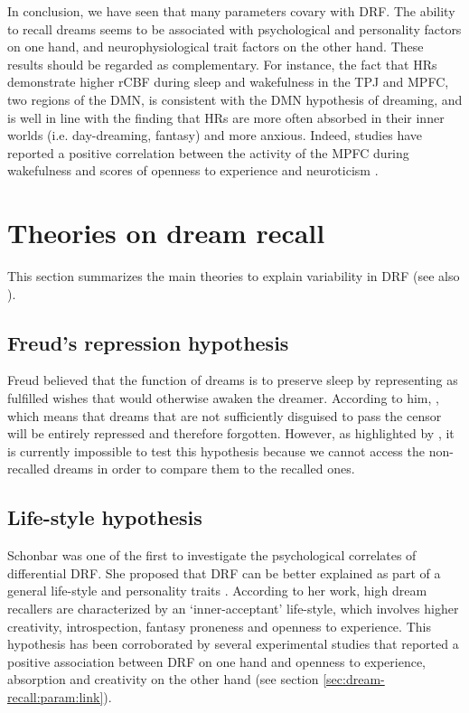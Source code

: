 In conclusion, we have seen that many parameters covary with DRF. The ability to recall dreams seems to be associated with psychological and personality factors on one hand, and neurophysiological trait factors on the other hand. These results should be regarded as complementary. For instance, the fact that HRs demonstrate higher rCBF during sleep and wakefulness in the TPJ and MPFC, two regions of the DMN, is consistent with the DMN hypothesis of dreaming, and is well in line with the finding that HRs are more often absorbed in their inner worlds (i.e. day-dreaming, fantasy) and more anxious. Indeed, studies have reported a positive correlation between the activity of the MPFC during wakefulness and scores of openness to experience \citep{sutin_sex_2009} and neuroticism \citep{zald_brain_2002}.

\section{Theories on dream recall}
\label{sec:dream-recall:theories}

This section summarizes the main theories to explain variability in DRF (see also \citealp{schredl_dream_1996}).

\subsection{Freud’s repression hypothesis}
\label{sec:dream-recall:theories:freud}

Freud believed that the function of dreams is to preserve sleep by representing as fulfilled wishes that would otherwise awaken the dreamer. According to him,  \citep{freud_interpretation_1900}, which means that dreams that are not sufficiently disguised to pass the censor will be entirely repressed and therefore forgotten. However, as highlighted by \citet{schredl_dream_1999}, it is currently impossible to test this hypothesis because we cannot access the non-recalled dreams in order to compare them to the recalled ones.

\subsection{Life-style hypothesis}
\label{sec:dream-recall:theories:life-style}

Schonbar was one of the first to investigate the psychological correlates of differential DRF. She proposed that DRF can be better explained as part of a general life-style and personality traits \citep{schonbar_differential_1965}. According to her work, high dream recallers are characterized by an ‘inner-acceptant’ life-style, which involves higher creativity, introspection, fantasy proneness and openness to experience. This hypothesis has been corroborated by several experimental studies that reported a positive association between DRF on one hand and openness to experience, absorption and creativity on the other hand (see section \ref{sec:dream-recall:param:link}).


